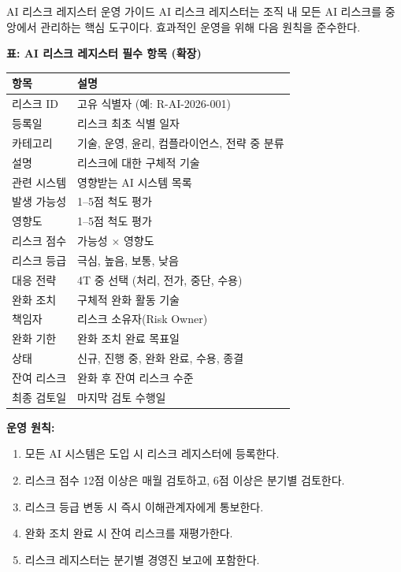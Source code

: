 \begin{practicaltool}{AI 리스크 레지스터 운영 가이드}
AI 리스크 레지스터는 조직 내 모든 AI 리스크를 중앙에서 관리하는 핵심 도구이다. 효과적인 운영을 위해 다음 원칙을 준수한다.

\textbf{표: AI 리스크 레지스터 필수 항목 (확장)}
\label{tab:risk_register_extended}

\centering
\begin{tabularx}{\textwidth}{p{2.8cm}X}
\toprule
\textbf{항목} & \textbf{설명} \\
\midrule
리스크 ID & 고유 식별자 (예: R-AI-2026-001) \\
등록일 & 리스크 최초 식별 일자 \\
카테고리 & 기술, 운영, 윤리, 컴플라이언스, 전략 중 분류 \\
설명 & 리스크에 대한 구체적 기술 \\
관련 시스템 & 영향받는 AI 시스템 목록 \\
발생 가능성 & 1--5점 척도 평가 \\
영향도 & 1--5점 척도 평가 \\
리스크 점수 & 가능성 $\times$ 영향도 \\
리스크 등급 & 극심, 높음, 보통, 낮음 \\
대응 전략 & 4T 중 선택 (처리, 전가, 중단, 수용) \\
완화 조치 & 구체적 완화 활동 기술 \\
책임자 & 리스크 소유자(Risk Owner) \\
완화 기한 & 완화 조치 완료 목표일 \\
상태 & 신규, 진행 중, 완화 완료, 수용, 종결 \\
잔여 리스크 & 완화 후 잔여 리스크 수준 \\
최종 검토일 & 마지막 검토 수행일 \\
\bottomrule
\end{tabularx}

\textbf{운영 원칙:}
\begin{enumerate}
 \item 모든 AI 시스템은 도입 시 리스크 레지스터에 등록한다.
 \item 리스크 점수 12점 이상은 매월 검토하고, 6점 이상은 분기별 검토한다.
 \item 리스크 등급 변동 시 즉시 이해관계자에게 통보한다.
 \item 완화 조치 완료 시 잔여 리스크를 재평가한다.
 \item 리스크 레지스터는 분기별 경영진 보고에 포함한다.
\end{enumerate}
\end{practicaltool}

